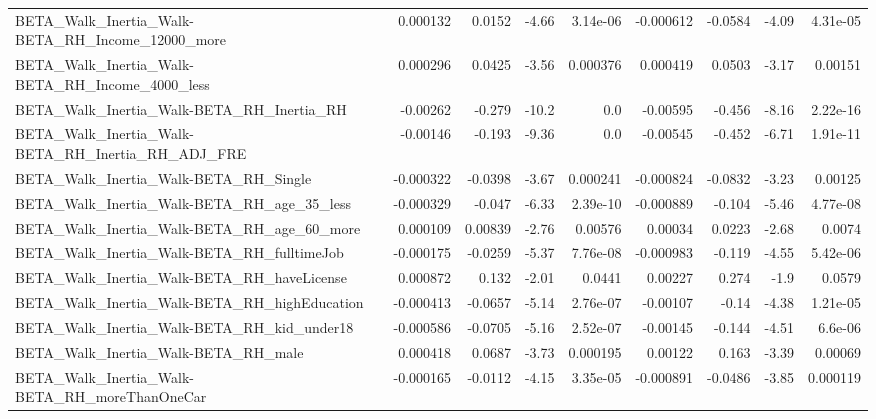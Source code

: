 \begin{tabular}{lrrrrrrrr}
BETA\_Walk\_Inertia\_Walk-BETA\_RH\_Income\_12000\_more   &    0.000132 &       0.0152 &    -4.66 & 3.14e-06 &  -0.000612 &     -0.0584 &        -4.09 &      4.31e-05 \\
BETA\_Walk\_Inertia\_Walk-BETA\_RH\_Income\_4000\_less    &    0.000296 &       0.0425 &    -3.56 & 0.000376 &   0.000419 &      0.0503 &        -3.17 &       0.00151 \\
BETA\_Walk\_Inertia\_Walk-BETA\_RH\_Inertia\_RH          &    -0.00262 &       -0.279 &    -10.2 &      0.0 &   -0.00595 &      -0.456 &        -8.16 &      2.22e-16 \\
BETA\_Walk\_Inertia\_Walk-BETA\_RH\_Inertia\_RH\_ADJ\_FRE  &    -0.00146 &       -0.193 &    -9.36 &      0.0 &   -0.00545 &      -0.452 &        -6.71 &      1.91e-11 \\
BETA\_Walk\_Inertia\_Walk-BETA\_RH\_Single              &   -0.000322 &      -0.0398 &    -3.67 & 0.000241 &  -0.000824 &     -0.0832 &        -3.23 &       0.00125 \\
BETA\_Walk\_Inertia\_Walk-BETA\_RH\_age\_35\_less         &   -0.000329 &       -0.047 &    -6.33 & 2.39e-10 &  -0.000889 &      -0.104 &        -5.46 &      4.77e-08 \\
BETA\_Walk\_Inertia\_Walk-BETA\_RH\_age\_60\_more         &    0.000109 &      0.00839 &    -2.76 &  0.00576 &    0.00034 &      0.0223 &        -2.68 &        0.0074 \\
BETA\_Walk\_Inertia\_Walk-BETA\_RH\_fulltimeJob         &   -0.000175 &      -0.0259 &    -5.37 & 7.76e-08 &  -0.000983 &      -0.119 &        -4.55 &      5.42e-06 \\
BETA\_Walk\_Inertia\_Walk-BETA\_RH\_haveLicense         &    0.000872 &        0.132 &    -2.01 &   0.0441 &    0.00227 &       0.274 &         -1.9 &        0.0579 \\
BETA\_Walk\_Inertia\_Walk-BETA\_RH\_highEducation       &   -0.000413 &      -0.0657 &    -5.14 & 2.76e-07 &   -0.00107 &       -0.14 &        -4.38 &      1.21e-05 \\
BETA\_Walk\_Inertia\_Walk-BETA\_RH\_kid\_under18         &   -0.000586 &      -0.0705 &    -5.16 & 2.52e-07 &   -0.00145 &      -0.144 &        -4.51 &       6.6e-06 \\
BETA\_Walk\_Inertia\_Walk-BETA\_RH\_male                &    0.000418 &       0.0687 &    -3.73 & 0.000195 &    0.00122 &       0.163 &        -3.39 &       0.00069 \\
BETA\_Walk\_Inertia\_Walk-BETA\_RH\_moreThanOneCar      &   -0.000165 &      -0.0112 &    -4.15 & 3.35e-05 &  -0.000891 &     -0.0486 &        -3.85 &      0.000119 \\

\end{tabular}
